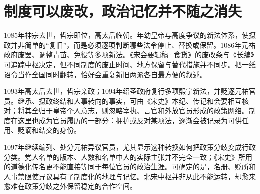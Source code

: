 \section{制度可以废改，政治记忆并不随之消失}

1085年神宗去世，哲宗即位，高太后临朝。年幼皇帝与高度争议的新法体系，使摄政并非简单的“复旧”，而是必须逐项判断哪些法令停止、替换或保留。1086年元祐政府废罢、调整青苗、免役等多项新法。《宋会要辑稿·食货》的废改条与《长编》可追踪中枢决定，但不同制度的废止时间、地方保留与替代措施并不同步。把一纸诏令当作全国同时翻转，恰好会重复新旧两派各自最方便的叙述。

1093年高太后去世，哲宗亲政；1094年绍圣政府复行多项熙宁新法，并贬逐元祐官员。继承、摄政终结和人事转向的事实，可由《宋史》本纪、传记和会要相互核对；将其全归于皇帝个人意志，则忽略宰执、言官和外放官员形成的政策网络。制度在这里也成为官员履历的一部分：拥护或反对某项法，逐渐会被记录为可供任用、贬谪和结交的身份。

1097年继续编列、处分元祐异议官员，尤其显示这种转换如何把政策分歧变成行政分类。党人名单的版本、人数和名单中人的实际主张并不完全一致；《宋史》所用的道德化传名更不能直接等同于每位官员的政治生涯。可确定的是，名册、贬所和人事禁限使异议具有了制度化的地理与记忆。北宋中枢并非从此不能运转，却愈来愈难在政策分歧之外保留稳定的合作空间。
